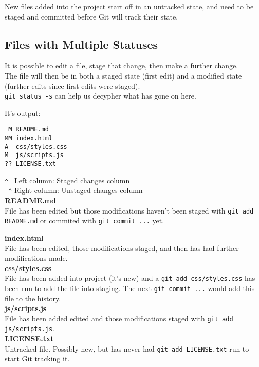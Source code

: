 
New files added into the project start off in an untracked state, and need to be staged and committed before Git will track their state.

\subsection{Files with Multiple Statuses}

It is possible to edit a file, stage that change, then make a further change.
\\

The file will then be in both a staged state (first edit) and a modified state (further edits since first edits were staged).
\\

\texttt{git status -s} can help us decypher what has gone on here.

It's output:

\begin{verbatim}
 M README.md
MM index.html
A  css/styles.css
M  js/scripts.js
?? LICENSE.txt
\end{verbatim}

\texttt{⌃ } Left column: Staged changes column
\\
\texttt{ ⌃} Right column: Unstaged changes column
\\

\textbf{README.md}
\\
File has been edited but those modifications haven't been staged with \texttt{git add README.md} or commited with \texttt{git commit ...} yet.


\textbf{index.html}
\\
File has been edited, those modifications staged, and then has had further modifications made.
\\

\textbf{css/styles.css}
\\
File has been added into project (it's new) and a \texttt{git add css/styles.css} has been run to add the file into staging. The next \texttt{git commit ...} would add this file to the history.
\\

\textbf{js/scripts.js}
\\
File has been added edited and those modifications staged with \texttt{git add js/scripts.js}.
\\

\textbf{LICENSE.txt}
\\
Untracked file. Possibly new, but has never had \texttt{git add LICENSE.txt} run to start Git tracking it.
\\
